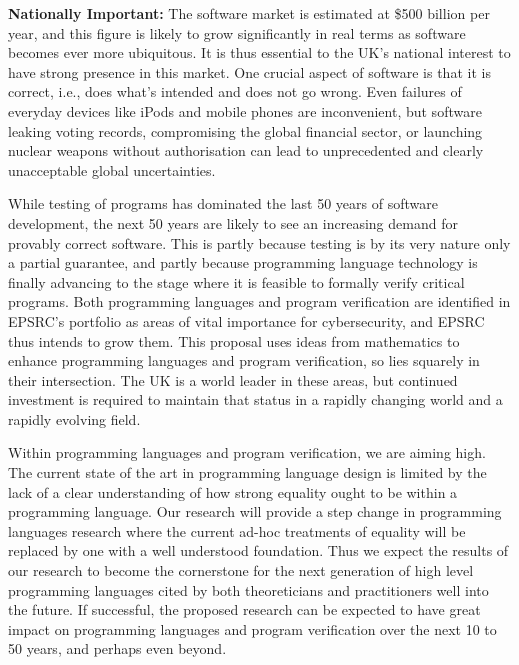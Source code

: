 \documentclass[a4paper,11pt]{article}
\begin{document}
\vspace*{0.02in}

{\bf Nationally Important:} The software market is estimated at \$500
billion per year, and this figure is likely to grow 
significantly in real terms 
as software becomes ever more
ubiquitous. It is thus essential to the UK's national interest to have 
strong presence in this market. One crucial aspect of software is that
it is correct, i.e., does what's intended and does not go wrong.  Even
failures of everyday devices like iPods and mobile phones are
inconvenient,
but software leaking voting records,
compromising %
the global financial sector, or launching 
nuclear weapons without authorisation 
can lead to unprecedented and clearly unacceptable global uncertainties.

While testing of programs has dominated the last 50 years of software
development,
the next 50 years are likely to see an increasing
demand for provably correct software. This is partly because testing
is by its very nature only a partial guarantee, and partly because
programming language technology is finally advancing to the stage
where it is feasible to formally verify critical programs.
Both programming languages and program verification are identified in
EPSRC's portfolio as areas of vital 
importance for cybersecurity, and EPSRC
thus intends to grow them.
This proposal 
uses ideas from mathematics  to enhance 
programming languages and  program
verification, so lies squarely in their intersection. %
The UK is a world leader
in these areas, but continued investment is required to maintain that
status in a rapidly changing world and a rapidly evolving field.

Within programming languages and program verification, we are aiming
high.  The current state of the art in programming language design is
limited by the lack of a clear understanding of how strong equality
ought to be within a programming language. Our research will provide a
step change in programming languages research where the current
ad-hoc treatments of equality will be replaced by one with a well
understood foundation. Thus we expect the results of our research to
become the cornerstone for the next generation of high level
programming languages cited by both
theoreticians and practitioners well into the future. If successful, 
the proposed research can
be expected to have great impact on programming languages and program
verification over the next 10 to 50 years, and perhaps even beyond. 
\end{document}
